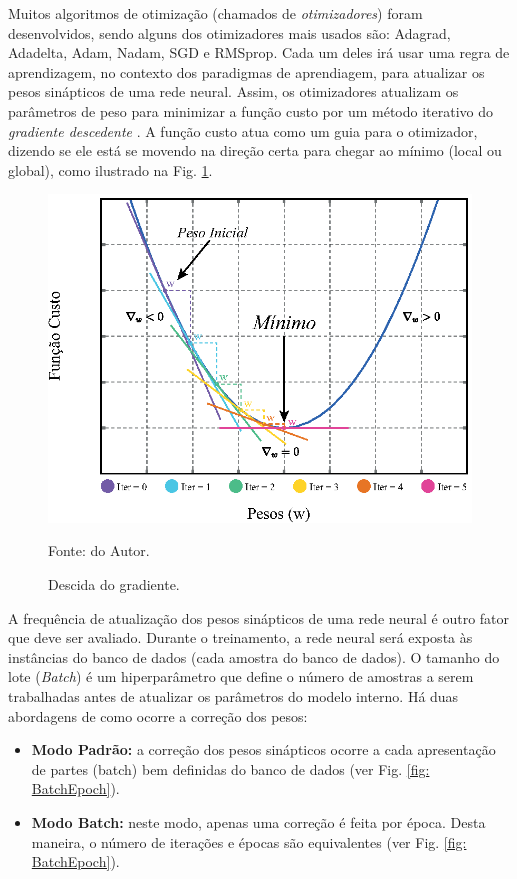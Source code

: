 Muitos algoritmos de otimização (chamados de \textit{otimizadores}) foram desenvolvidos, sendo alguns dos otimizadores mais usados são: Adagrad, Adadelta, Adam, Nadam, SGD e RMSprop. Cada um deles irá usar uma regra de aprendizagem, no contexto dos paradigmas de aprendiagem, para atualizar os pesos sinápticos de uma rede neural. Assim, os otimizadores atualizam os parâmetros de peso para minimizar a função custo por um método iterativo do \textit{gradiente descedente} \cite{haykin2007redes,bottou2010large,geron2019hands}. A função custo atua como um guia para o otimizador, dizendo se ele está se movendo na direção certa para chegar ao mínimo (local ou global), como ilustrado na Fig. \ref{fig: GradientDescent}.

\begin{figure}[H]
    \centering
    \includegraphics{04-Figuras/GradientDescent.eps}
    \caption{Descida do gradiente.} \par
    Fonte: do Autor.
    \label{fig: GradientDescent}
\end{figure}

A frequência de atualização dos pesos sinápticos de uma rede neural é outro fator que deve ser avaliado. Durante o treinamento, a rede neural será exposta às instâncias do banco de dados (cada amostra do banco de dados). O tamanho do lote (\textit{Batch}) é um hiperparâmetro que define o número de amostras a serem trabalhadas antes de atualizar os parâmetros do modelo interno. Há duas abordagens de como ocorre a correção dos pesos:

\begin{itemize}
    \item \textbf{Modo Padrão:} a correção dos pesos sinápticos ocorre a cada apresentação de partes (batch) bem definidas do banco de dados (ver Fig. \ref{fig: BatchEpoch}).
    \item \textbf{Modo Batch:} neste modo, apenas uma correção é feita por época. Desta maneira, o número de iterações e épocas são equivalentes (ver Fig. \ref{fig: BatchEpoch}).
\end{itemize}

